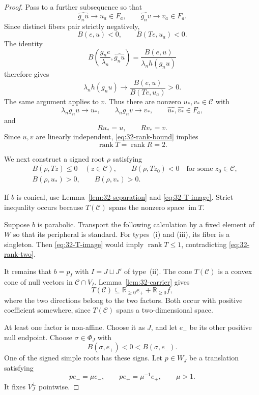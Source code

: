 \documentclass[11pt,reqno]{amsart}
\theoremstyle{plain}
\theoremstyle{definition}
\theoremstyle{remark}
\numberwithin{equation}{section}
\begin{document}
\begin{proof}
Pass to a further subsequence so that
\[
    \widehat{g_nu}\to u_a\in F_a,\qquad
    \widehat{g_nv}\to v_a\in F_a.
\]
Since distinct fibers pair strictly negatively,
\[
    B(e,u)<0,\qquad B(Te,u_a)<0.
\]
The identity
\[
    B\left(
        \frac{g_ne}{\lambda_n},
        \widehat{g_nu}
    \right)
    =
    \frac{B(e,u)}{\lambda_n h(g_nu)}
\]
therefore gives
\[
    \lambda_n h(g_nu)
    \longrightarrow
    \frac{B(e,u)}{B(Te,u_a)}>0.
\]
The same argument applies to $v$.
Thus there are nonzero $u_*,v_*\in\mathcal C$ with
\begin{equation}\label{eq:32-small-vectors}
    \lambda_ng_nu\to u_*,
    \qquad
    \lambda_ng_nv\to v_*,
    \qquad
    \widehat{u_*},\widehat{v_*}\in F_a,
\end{equation}
and
\[
    Ru_*=u,\qquad Rv_*=v.
\]
Since $u,v$ are linearly independent,
\eqref{eq:32-rank-bound} implies
\begin{equation}\label{eq:32-rank-two}
    \operatorname{rank}T=\operatorname{rank}R=2.
\end{equation}

We next construct a signed root $\rho$ satisfying
\begin{align}
    &B(\rho,Tz)\leq0\quad(z\in\mathcal C),
    \qquad
    B(\rho,Tz_0)<0
    \quad\text{for some }z_0\in\mathcal C,
    \label{eq:32-target1}\\
    &B(\rho,u_*)>0,\qquad B(\rho,v_*)>0.
    \label{eq:32-target2}
\end{align}

If $b$ is conical, use Lemma~\ref{lem:32-separation}
and \eqref{eq:32-T-image}.
Strict inequality occurs because $T(\mathcal C)$
spans the nonzero space $\operatorname{im}T$.

Suppose $b$ is parabolic.
Transport the following calculation by a fixed element
of $W$ so that its peripheral is standard.
For types~\textup{(i)} and \textup{(iii)}, its fiber is a
singleton.
Then \eqref{eq:32-T-image} would imply
$\operatorname{rank}T\leq1$, contradicting
\eqref{eq:32-rank-two}.

It remains that $b=p_I$ with $I=J\sqcup J'$ of
type~\textup{(ii)}.
The cone $T(\mathcal C)$ is a convex cone of null vectors
in $\mathcal C\cap V_I$.
Lemma~\ref{lem:32-carrier} gives
\[
    T(\mathcal C)
    \subseteq
    \mathbb R_{\geq0}e_+
    +\mathbb R_{\geq0}f,
\]
where the two directions belong to the two factors.
Both occur with positive coefficient somewhere,
since $T(\mathcal C)$ spans a two-dimensional space.

At least one factor is non-affine.
Choose it as $J$, and let $e_-$ be its other positive
null endpoint.
Choose $\sigma\in\Phi_J$ with
\[
    B(\sigma,e_+)<0<B(\sigma,e_-).
\]
One of the signed simple roots has these signs.
Let $p\in W_J$ be a translation satisfying
\[
    pe_-=\mu e_-,
    \qquad
    pe_+=\mu^{-1}e_+,
    \qquad
    \mu>1.
\]
It fixes $V_J^\perp$ pointwise.


\end{proof}
\end{document}
